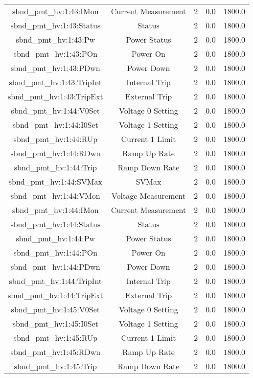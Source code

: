 \begin{center}
\begin{longtable}{c | c c c c }
sbnd\_pmt\_hv:1:43:IMon & Current Measurement & 2 & 0.0 & 1800.0\\ 
sbnd\_pmt\_hv:1:43:Status & Status & 2 & 0.0 & 1800.0\\ 
sbnd\_pmt\_hv:1:43:Pw & Power Status & 2 & 0.0 & 1800.0\\ 
sbnd\_pmt\_hv:1:43:POn & Power On & 2 & 0.0 & 1800.0\\ 
sbnd\_pmt\_hv:1:43:PDwn & Power Down & 2 & 0.0 & 1800.0\\ 
sbnd\_pmt\_hv:1:43:TripInt & Internal Trip & 2 & 0.0 & 1800.0\\ 
sbnd\_pmt\_hv:1:43:TripExt & External Trip & 2 & 0.0 & 1800.0\\ 
sbnd\_pmt\_hv:1:44:V0Set & Voltage 0 Setting & 2 & 0.0 & 1800.0\\ 
sbnd\_pmt\_hv:1:44:I0Set & Voltage 1 Setting & 2 & 0.0 & 1800.0\\ 
sbnd\_pmt\_hv:1:44:RUp & Current 1 Limit & 2 & 0.0 & 1800.0\\ 
sbnd\_pmt\_hv:1:44:RDwn & Ramp Up Rate & 2 & 0.0 & 1800.0\\ 
sbnd\_pmt\_hv:1:44:Trip & Ramp Down Rate & 2 & 0.0 & 1800.0\\ 
sbnd\_pmt\_hv:1:44:SVMax & SVMax & 2 & 0.0 & 1800.0\\ 
sbnd\_pmt\_hv:1:44:VMon & Voltage Measurement & 2 & 0.0 & 1800.0\\ 
sbnd\_pmt\_hv:1:44:IMon & Current Measurement & 2 & 0.0 & 1800.0\\ 
sbnd\_pmt\_hv:1:44:Status & Status & 2 & 0.0 & 1800.0\\ 
sbnd\_pmt\_hv:1:44:Pw & Power Status & 2 & 0.0 & 1800.0\\ 
sbnd\_pmt\_hv:1:44:POn & Power On & 2 & 0.0 & 1800.0\\ 
sbnd\_pmt\_hv:1:44:PDwn & Power Down & 2 & 0.0 & 1800.0\\ 
sbnd\_pmt\_hv:1:44:TripInt & Internal Trip & 2 & 0.0 & 1800.0\\ 
sbnd\_pmt\_hv:1:44:TripExt & External Trip & 2 & 0.0 & 1800.0\\ 
sbnd\_pmt\_hv:1:45:V0Set & Voltage 0 Setting & 2 & 0.0 & 1800.0\\ 
sbnd\_pmt\_hv:1:45:I0Set & Voltage 1 Setting & 2 & 0.0 & 1800.0\\ 
sbnd\_pmt\_hv:1:45:RUp & Current 1 Limit & 2 & 0.0 & 1800.0\\ 
sbnd\_pmt\_hv:1:45:RDwn & Ramp Up Rate & 2 & 0.0 & 1800.0\\ 
sbnd\_pmt\_hv:1:45:Trip & Ramp Down Rate & 2 & 0.0 & 1800.0\\ 

\end{longtable}
\end{center}
